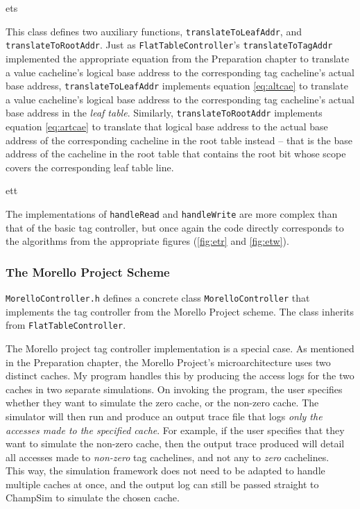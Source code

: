\begin{algorithm}[H]
	\centering
	{ets}
	\caption{\texttt{ETMController::setup}}
	\label{code:ets}
\end{algorithm}

This class defines two auxiliary functions, \texttt{translateToLeafAddr}, and \texttt{translateToRootAddr}. Just as \texttt{FlatTableController}'s \texttt{translateToTagAddr} implemented the appropriate equation from the Preparation chapter to translate a value cacheline's logical base address to the corresponding tag cacheline's actual base address, \texttt{translateToLeafAddr} implements equation \ref{eq:altcae} to translate a value cacheline's logical base address to the corresponding tag cacheline's actual base address in the \textit{leaf table}. Similarly, \texttt{translateToRootAddr} implements equation \ref{eq:artcae} to translate that logical base address to the actual base address of the corresponding cacheline in the root table instead -- that is the base address of the cacheline in the root table that contains the root bit whose scope covers the corresponding leaf table line.

\begin{algorithm}[H]
	\centering
	{ett}
	\caption{\texttt{ETMController::translateToLeafAddr} and \texttt{ETMController::translateToRootAddr}}
	\label{code:ett}
\end{algorithm}

The implementations of \texttt{handleRead} and \texttt{handleWrite} are more complex than that of the basic tag controller, but once again the code directly corresponds to the algorithms from the appropriate figures (\ref{fig:etr} and \ref{fig:etw}).

\subsubsection{The Morello Project Scheme}
\texttt{MorelloController.h} defines a concrete class \texttt{MorelloController} that implements the tag controller from the Morello Project scheme. The class inherits from \texttt{FlatTableController}.

The Morello project tag controller implementation is a special case. As mentioned in the Preparation chapter, the Morello Project's microarchitecture uses two distinct caches. My program handles this by producing the access logs for the two caches in two separate simulations.
On invoking the program, the user specifies whether they want to simulate the zero cache, or the non-zero cache. The simulator will then run and produce an output trace file that logs \textit{only the accesses made to the specified cache}. For example, if the user specifies that they want to simulate the non-zero cache, then the output trace produced will detail all accesses made to \textit{non-zero} tag cachelines, and not any to \textit{zero} cachelines.\\
This way, the simulation framework does not need to be adapted to handle multiple caches at once, and the output log can still be passed straight to ChampSim to simulate the chosen cache.

